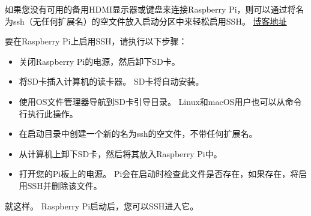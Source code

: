 如果您没有可用的备用HDMI显示器或键盘来连接Raspberry Pi，则可以通过将名为ssh（无任何扩展名）的空文件放入启动分区中来轻松启用SSH。
\href{https://raspberrypi.club/293.html}{博客地址}
\par
要在Raspberry Pi上启用SSH，请执行以下步骤：
\begin{itemize}
    \item 关闭Raspberry Pi的电源，然后卸下SD卡。
    \item 将SD卡插入计算机的读卡器。 SD卡将自动安装。
    \item 使用OS文件管理器导航到SD卡引导目录。 Linux和macOS用户也可以从命令行执行此操作。
    \item 在启动目录中创建一个新的名为ssh的空文件，不带任何扩展名。
    \item 从计算机上卸下SD卡，然后将其放入Raspberry Pi中。
    \item 打开您的Pi板上的电源。 Pi会在启动时检查此文件是否存在，如果存在，将启用SSH并删除该文件。
\end{itemize}
就这样。 Raspberry Pi启动后，您可以SSH进入它。